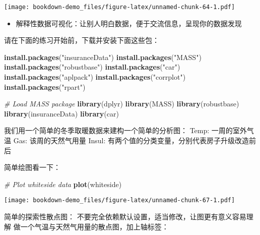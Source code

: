 \documentclass[]{book}
\newenvironment{Shaded}{\begin{snugshade}}{\end{snugshade}}
\newcommand{\CommentTok}[1]{\textcolor[rgb]{0.56,0.35,0.01}{\textit{#1}}}
\newcommand{\KeywordTok}[1]{\textcolor[rgb]{0.13,0.29,0.53}{\textbf{#1}}}
\newcommand{\NormalTok}[1]{#1}
\newcommand{\StringTok}[1]{\textcolor[rgb]{0.31,0.60,0.02}{#1}}
\providecommand{\tightlist}{%
  \setlength{\itemsep}{0pt}\setlength{\parskip}{0pt}}
\begin{document}
\texttt{[image: bookdown-demo\_files/figure-latex/unnamed-chunk-64-1.pdf]}

\begin{itemize}
\tightlist
\item
  解释性数据可视化：让别人明白数据，便于交流信息，呈现你的数据发现
\end{itemize}

请在下面的练习开始前，下载并安装下面这些包：

\begin{Shaded}
\begin{Highlighting}[]
\KeywordTok{install.packages}\NormalTok{(}\StringTok{"insuranceData"}\NormalTok{)}
\KeywordTok{install.packages}\NormalTok{(}\StringTok{"MASS"}\NormalTok{)}
\KeywordTok{install.packages}\NormalTok{(}\StringTok{"robustbase"}\NormalTok{)}
\KeywordTok{install.packages}\NormalTok{(}\StringTok{"car"}\NormalTok{)}
\KeywordTok{install.packages}\NormalTok{(}\StringTok{"aplpack"}\NormalTok{)}
\KeywordTok{install.packages}\NormalTok{(}\StringTok{"corrplot"}\NormalTok{)}
\KeywordTok{install.packages}\NormalTok{(}\StringTok{"rpart"}\NormalTok{)}
\end{Highlighting}
\end{Shaded}

\begin{Shaded}
\begin{Highlighting}[]
\CommentTok{# Load MASS package}
\KeywordTok{library}\NormalTok{(dplyr)}
\KeywordTok{library}\NormalTok{(MASS)}
\KeywordTok{library}\NormalTok{(robustbase)}
\KeywordTok{library}\NormalTok{(insuranceData)}
\KeywordTok{library}\NormalTok{(car)}
\end{Highlighting}
\end{Shaded}

我们用一个简单的冬季取暖数据来建构一个简单的分析图： Temp:
一周的室外气温 Gas: 该周的天然气用量 Insul:
有两个值的分类变量，分别代表房子升级改造前后

简单绘图看一下：

\begin{Shaded}
\begin{Highlighting}[]
\CommentTok{# Plot whiteside data}
\KeywordTok{plot}\NormalTok{(whiteside)}
\end{Highlighting}
\end{Shaded}

\texttt{[image: bookdown-demo\_files/figure-latex/unnamed-chunk-67-1.pdf]}

简单的探索性散点图：
不要完全依赖默认设置，适当修改，让图更有意义容易理解
做一个气温与天然气用量的散点图，加上轴标签：
\end{document}
